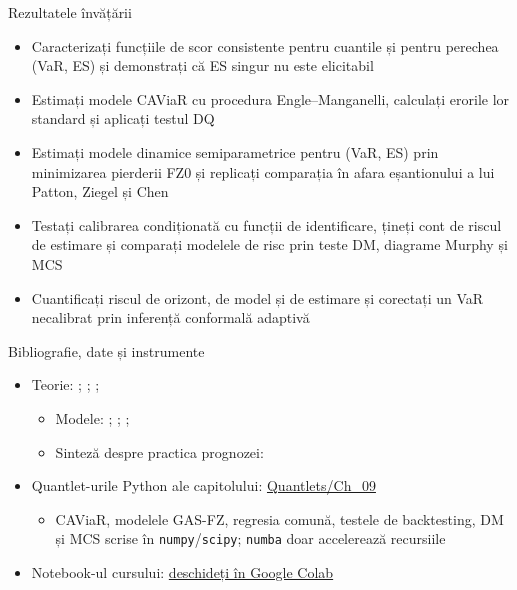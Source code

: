 \begin{frame}{Rezultatele învățării}
\itemsize{\small}
\begin{itemize}
    \item Caracterizați funcțiile de scor consistente pentru cuantile și pentru perechea (VaR, ES) și demonstrați că ES singur nu este elicitabil
    \item Estimați modele CAViaR cu procedura Engle--Manganelli, calculați erorile lor standard și aplicați testul DQ
    \item Estimați modele dinamice semiparametrice pentru (VaR, ES) prin minimizarea pierderii FZ0 și replicați comparația în afara eșantionului a lui Patton, Ziegel și Chen
    \item Testați calibrarea condiționată cu funcții de identificare, țineți cont de riscul de estimare și comparați modelele de risc prin teste DM, diagrame Murphy și MCS
    \item Cuantificați riscul de orizont, de model și de estimare și corectați un VaR necalibrat prin inferență conformală adaptivă
\end{itemize}
\end{frame}

\begin{frame}{Bibliografie, date și instrumente}
\itemsize{\small}
\begin{itemize}
    \item Teorie: ; ; ; 
    \begin{itemize}
        \item Modele: ; ; ; 
        \item Sinteză despre practica prognozei: 
    \end{itemize}
    \item Quantlet-urile Python ale capitolului: \href{https://github.com/danpele/Advanced-Time-Series/tree/main/Quantlets/Ch_09}{Quantlets/Ch\_09}
    \begin{itemize}
        \item CAViaR, modelele GAS-FZ, regresia comună, testele de backtesting, DM și MCS scrise în \texttt{numpy}/\texttt{scipy}; \texttt{numba} doar accelerează recursiile
    \end{itemize}
    \item Notebook-ul cursului: \href{\colaburl{notebooks/EN/chapter9_lecture_notebook.ipynb}}{deschideți în Google Colab}
\end{itemize}
\end{frame}

